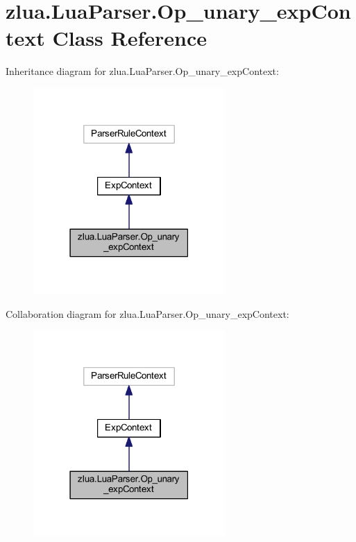 \hypertarget{classzlua_1_1_lua_parser_1_1_op__unary__exp_context}{}\section{zlua.\+Lua\+Parser.\+Op\+\_\+unary\+\_\+exp\+Context Class Reference}
\label{classzlua_1_1_lua_parser_1_1_op__unary__exp_context}


Inheritance diagram for zlua.\+Lua\+Parser.\+Op\+\_\+unary\+\_\+exp\+Context\+:
\nopagebreak
\begin{figure}[H]
\begin{center}
\leavevmode
\includegraphics[width=207pt]{classzlua_1_1_lua_parser_1_1_op__unary__exp_context__inherit__graph}
\end{center}
\end{figure}


Collaboration diagram for zlua.\+Lua\+Parser.\+Op\+\_\+unary\+\_\+exp\+Context\+:
\nopagebreak
\begin{figure}[H]
\begin{center}
\leavevmode
\includegraphics[width=207pt]{classzlua_1_1_lua_parser_1_1_op__unary__exp_context__coll__graph}
\end{center}
\end{figure}
